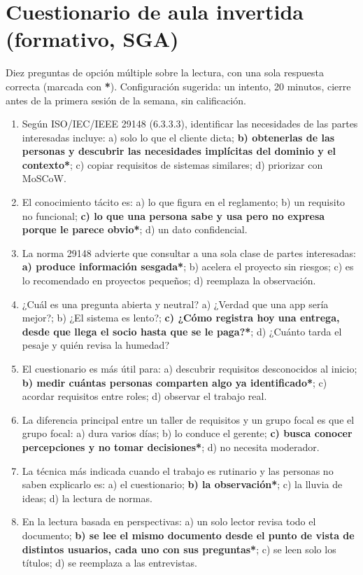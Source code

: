 \documentclass[11pt]{article}
\newcommand{\seccion}[1]{\section{\textcolor{utegreendk}{#1}}}
\begin{document}
\seccion{Cuestionario de aula invertida (formativo, SGA)}

Diez preguntas de opción múltiple sobre la lectura, con una sola respuesta correcta (marcada con \textbf{*}). Configuración sugerida: un intento, 20 minutos, cierre antes de la primera sesión de la semana, sin calificación.

\begin{enumerate}[leftmargin=20pt,itemsep=6pt]
	\item Según ISO/IEC/IEEE 29148 (6.3.3.3), identificar las necesidades de las partes interesadas incluye: a) solo lo que el cliente dicta; \textbf{b) obtenerlas de las personas y descubrir las necesidades implícitas del dominio y el contexto*}; c) copiar requisitos de sistemas similares; d) priorizar con MoSCoW.
	\item El conocimiento tácito es: a) lo que figura en el reglamento; b) un requisito no funcional; \textbf{c) lo que una persona sabe y usa pero no expresa porque le parece obvio*}; d) un dato confidencial.
	\item La norma 29148 advierte que consultar a una sola clase de partes interesadas: \textbf{a) produce información sesgada*}; b) acelera el proyecto sin riesgos; c) es lo recomendado en proyectos pequeños; d) reemplaza la observación.
	\item ¿Cuál es una pregunta abierta y neutral? a) ¿Verdad que una app sería mejor?; b) ¿El sistema es lento?; \textbf{c) ¿Cómo registra hoy una entrega, desde que llega el socio hasta que se le paga?*}; d) ¿Cuánto tarda el pesaje y quién revisa la humedad?
	\item El cuestionario es más útil para: a) descubrir requisitos desconocidos al inicio; \textbf{b) medir cuántas personas comparten algo ya identificado*}; c) acordar requisitos entre roles; d) observar el trabajo real.
	\item La diferencia principal entre un taller de requisitos y un grupo focal es que el grupo focal: a) dura varios días; b) lo conduce el gerente; \textbf{c) busca conocer percepciones y no tomar decisiones*}; d) no necesita moderador.
	\item La técnica más indicada cuando el trabajo es rutinario y las personas no saben explicarlo es: a) el cuestionario; \textbf{b) la observación*}; c) la lluvia de ideas; d) la lectura de normas.
	\item En la lectura basada en perspectivas: a) un solo lector revisa todo el documento; \textbf{b) se lee el mismo documento desde el punto de vista de distintos usuarios, cada uno con sus preguntas*}; c) se leen solo los títulos; d) se reemplaza a las entrevistas.

\end{enumerate}
\end{document}

